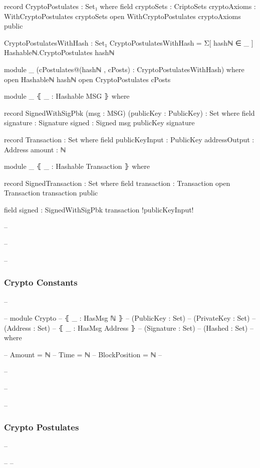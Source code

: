 \documentclass{beamer}
\begin{document}
\begin{frame}
{\begin{code}
  record CryptoPostulates : Set₁ where
    field
      cryptoSets : CriptoSets
      cryptoAxioms : WithCryptoPostulates cryptoSets
    open WithCryptoPostulates cryptoAxioms public

CryptoPostulatesWithHash : Set₁
CryptoPostulatesWithHash = Σ[ hashℕ ∈ _ ] Hashableℕ.CryptoPostulates hashℕ

module _ (cPostulates@(hashℕ , cPosts) : CryptoPostulatesWithHash) where
  open Hashableℕ hashℕ
  open CryptoPostulates cPosts

  module _ ⦃ _ : Hashable MSG ⦄ where

    record SignedWithSigPbk  (msg : MSG) (publicKey : PublicKey) : Set where
      field
        signature : Signature
        signed    : Signed msg publicKey signature


  record Transaction : Set where
    field
      publicKeyInput : PublicKey
      addressOutput  : Address
      amount         : ℕ

  module _ ⦃ _ : Hashable Transaction ⦄ where

    record SignedTransaction  : Set where
      field
        transaction : Transaction
      open Transaction transaction public

      field
        signed : SignedWithSigPbk transaction {!publicKeyInput!}



\end{code}
}

-- \end{frame}

-- \begin{frame}
--   \frametitle{Crypto Constants}
-- \begin{code}

-- module Crypto
--   ⦃ _ : HasMsg ℕ ⦄
--   (PublicKey : Set)
--   (PrivateKey : Set)
--   (Address : Set)
--   ⦃ _ : HasMsg Address ⦄
--   (Signature : Set)
--   (Hashed : Set)
--   where

--   Amount = ℕ
--   Time = ℕ
--   BlockPosition = ℕ
-- \end{code}
-- \end{frame}

-- \begin{frame}
--   \frametitle{Crypto Postulates}
-- 
-- 
-- \end{frame}
\end{document}
